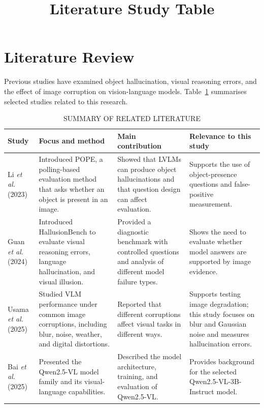 \documentclass[conference]{IEEEtran}
\title{Literature Study Table}
\author{\IEEEauthorblockN{Akshat Sajwal, Sameer Mishra, Rakshit Kumar Jha, Ananya Gupta, Ayush NA}
\IEEEauthorblockA{School of Computer Science\\University of Petroleum and Energy Studies (UPES)\\Dehradun, India}}
\begin{document}
\maketitle

\section{Literature Review}
Previous studies have examined object hallucination, visual reasoning errors, and the effect of image corruption on vision-language models. Table~\ref{tab:literature} summarises selected studies related to this research.

\begin{table}[!t]
\caption{SUMMARY OF RELATED LITERATURE}
\label{tab:literature}
\centering
\footnotesize
\renewcommand{\arraystretch}{1.18}
\begin{tabular}{p{}p{}p{}p{}}
\toprule
\textbf{Study} & \textbf{Focus and method} & \textbf{Main contribution} & \textbf{Relevance to this study}\\
\midrule
Li \emph{et al.} (2023) \cite{pope} &
Introduced POPE, a polling-based evaluation method that asks whether an object is present in an image. &
Showed that LVLMs can produce object hallucinations and that question design can affect evaluation. &
Supports the use of object-presence questions and false-positive measurement.\\

Guan \emph{et al.} (2024) \cite{hallusion} &
Introduced HallusionBench to evaluate visual reasoning errors, language hallucination, and visual illusion. &
Provided a diagnostic benchmark with controlled questions and analysis of different model failure types. &
Shows the need to evaluate whether model answers are supported by image evidence.\\

Usama \emph{et al.} (2025) \cite{corruptions} &
Studied VLM performance under common image corruptions, including blur, noise, weather, and digital distortions. &
Reported that different corruptions affect visual tasks in different ways. &
Supports testing image degradation; this study focuses on blur and Gaussian noise and measures hallucination errors.\\

Bai \emph{et al.} (2025) \cite{qwen} &
Presented the Qwen2.5-VL model family and its visual-language capabilities. &
Described the model architecture, training, and evaluation of Qwen2.5-VL. &
Provides background for the selected Qwen2.5-VL-3B-Instruct model.\\
\bottomrule
\end{tabular}
\end{table}
\end{document}
